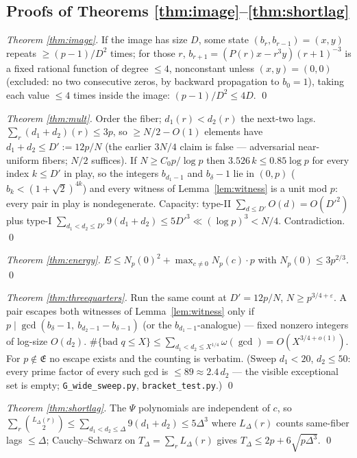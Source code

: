 \subsection{Proofs of Theorems \ref{thm:image}--\ref{thm:shortlag}}

\emph{Theorem \ref{thm:image}.}  If the image has size $D$, some state
$(b_r,b_{r-1})=(x,y)$ repeats $\ge(p-1)/D^2$ times; for those $r$,
$b_{r+1}=(P(r)x-r^3y)(r+1)^{-3}$ is a fixed rational function of degree
$\le4$, nonconstant unless $(x,y)=(0,0)$ (excluded: no two consecutive zeros,
by backward propagation to $b_0=1$), taking each value $\le4$ times inside the
image: $(p-1)/D^2\le4D$. \qed

\emph{Theorem \ref{thm:mult}.}  Order the fiber; $d_1(r)<d_2(r)$ the next-two
lags.  $\sum_r(d_1+d_2)(r)\le3p$, so $\ge N/2-O(1)$ elements have
$d_1+d_2\le D':=12p/N$ (the earlier $3N/4$ claim is false — adversarial
near-uniform fibers; $N/2$ suffices).  If $N\ge C_0p/\log p$ then
$3.526\,k\le0.85\log p$ for every index $k\le D'$ in play, so the integers
$b_{d_1-1}$ and $b_\delta-1$ lie in $(0,p)$ ($b_k<(1+\sqrt2)^{4k}$) and every
witness of Lemma~\ref{lem:witness} is a unit mod $p$: every pair in play is
nondegenerate.  Capacity: type-II $\sum_{d\le D'}O(d)=O(D'^2)$ plus type-I
$\sum_{d_1<d_2\le D'}9(d_1+d_2)\le5D'^3\ll(\log p)^3<N/4$.  Contradiction. \qed

\emph{Theorem \ref{thm:energy}.}  $E\le N_p(0)^2+\max_{c\ne0}N_p(c)\cdot p$
with $N_p(0)\le3p^{2/3}$. \qed

\emph{Theorem \ref{thm:threequarters}.}  Run the same count at
$D'=12p/N$, $N\ge p^{3/4+\varepsilon}$.  A pair escapes both witnesses of
Lemma~\ref{lem:witness} only if $p\mid\gcd(b_\delta-1,\ b_{d_2-1}-b_{\delta-1})$
(or the $b_{d_1-1}$-analogue) — fixed nonzero integers of log-size $O(d_2)$.
$\#\{\text{bad }q\le X\}\le\sum_{d_1<d_2\le X^{1/4}}\omega(\gcd)=O(X^{3/4+o(1)})$.
For $p\notin\mathfrak E$ no escape exists and the counting is verbatim.
(Sweep $d_1<20$, $d_2\le50$: every prime factor of every such gcd is
$\le89\approx2.4\,d_2$ — the visible exceptional set is empty;
\texttt{G\_wide\_sweep.py}, \texttt{bracket\_test.py}.) \qed

\emph{Theorem \ref{thm:shortlag}.}  The $\Psi$ polynomials are independent of
$c$, so $\sum_r\binom{L_\Delta(r)}2\le\sum_{d_1<d_2\le\Delta}9(d_1+d_2)\le
5\Delta^3$ where $L_\Delta(r)$ counts same-fiber lags $\le\Delta$;
Cauchy--Schwarz on $T_\Delta=\sum_rL_\Delta(r)$ gives
$T_\Delta\le2p+6\sqrt{p\Delta^3}$. \qed


